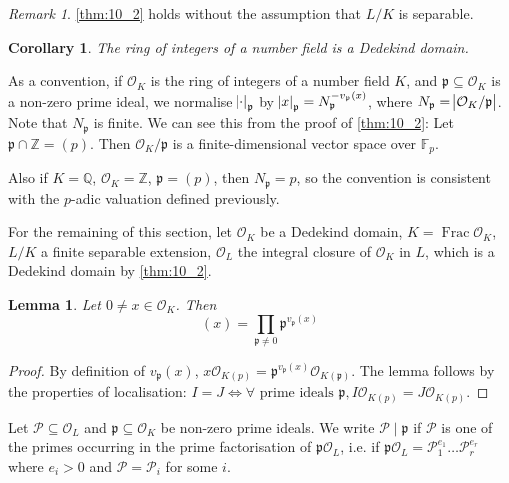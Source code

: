 \documentclass[11pt]{article}
\theoremstyle{definition}
\theoremstyle{plain}
\newtheorem{lemma}[definition]{Lemma}
\newtheorem{corollary}[definition]{Corollary}
\theoremstyle{remark}
\newtheorem*{remark}{Remark}
\DeclareMathOperator{\Frac}{Frac}
\newcommand{\bF}{\mathbb{F}}
\newcommand{\bZ}{\mathbb{Z}}
\newcommand{\bQ}{\mathbb{Q}}
\newcommand{\cO}{\mathcal{O}}
\newcommand{\cP}{\mathcal{P}}
\newcommand{\fp}{\mathfrak{p}}
\begin{document}
\begin{remark}
    \autoref{thm:10_2} holds without the assumption that $L / K$ is separable.
\end{remark}

\begin{corollary}\label{cor:10_3}
    The ring of integers of a number field is a Dedekind domain.
\end{corollary}

As a convention, if $\cO_K$ is the ring of integers of a number field $K$, and $\fp \subseteq \cO_K$ is a non-zero prime ideal, we normalise $\abs{\cdot}_\fp$ by $\abs{x}_\fp = N_\fp^{-v_\fp(x)}$, where $N_\fp = \abs{\cO_K / \fp}$. Note that $N_\fp$ is finite. We can see this from the proof of \autoref{thm:10_2}: Let $\fp \cap \bZ = (p)$. Then $\cO_K / \fp$ is a finite-dimensional vector space over $\bF_p$.

Also if $K = \bQ$, $\cO_K = \bZ$, $\fp = (p)$, then $N_\fp = p$, so the convention is consistent with the $p$-adic valuation defined previously.

For the remaining of this section, let $\cO_K$ be a Dedekind domain, $K = \Frac{\cO_K}$, $L / K$ a finite separable extension, $\cO_L$ the integral closure of $\cO_K$ in $L$, which is a Dedekind domain by \autoref{thm:10_2}.

\begin{lemma}\label{lem:10_4}
    Let $0 \neq x \in \cO_K$. Then
    \begin{equation*}
        (x) = \prod_{\fp \neq 0} \fp^{v_\fp(x)}
    \end{equation*}
\end{lemma}
\begin{proof}
    By definition of $v_\fp(x)$, $x \cO_{K(p)} = \fp^{v_\fp(x)} \cO_{K(\fp)}$. The lemma follows by the properties of localisation: $I = J \iff \forall \text{ prime ideals } \fp, I \cO_{K(p)} = J \cO_{K(p)}$.
\end{proof}

Let $\cP \subseteq \cO_L$ and $\fp \subseteq \cO_K$ be non-zero prime ideals. We write $\cP \mid \fp$ if $\cP$ is one of the primes occurring in the prime factorisation of $\fp \cO_L$, i.e. if $\fp \cO_L = \cP_1^{e_1} \ldots \cP_r^{e_r}$ where $e_i > 0$ and $\cP = \cP_i$ for some $i$.
\end{document}
